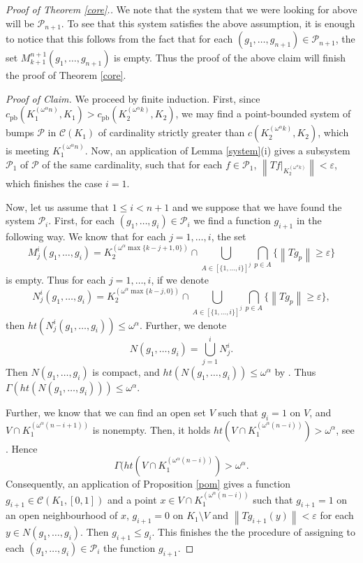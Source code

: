 \documentclass{amsart}
\numberwithin{equation}{section}
\theoremstyle{definition}
\def\C{\mathcal C}
\def\ep{\varepsilon}
\newcommand{\norm}[1]{\left\|#1\right\|}
\begin{document}
\begin{proof}[Proof of Theorem \ref{core}.]
We note that the system that we were looking for above will be $\mathcal{P}_{n+1}$. To see that this system satisfies the above assumption, it is enough to notice that this follows from the fact that for each $(g_1, \ldots, g_{n+1}) \in \mathcal{P}_{n+1}$, the set $M_{k+1}^{n+1}(g_1, \ldots, g_{n+1})$ is empty. Thus the proof of the above claim will finish the proof of Theorem \ref{core}.

\emph{Proof of Claim.}
We proceed by finite induction.
First, since $c_{\text{pb}}(K_1^{(\omega^{\alpha}n)}, K_1)>c_{\text{pb}}(K_2^{(\omega^{\alpha}k)}, K_2)$, we may find a point-bounded system of bumps $\mathcal{P}$ in $\C(K_1)$ of cardinality strictly greater than $c(K_2^{(\omega^{\alpha} k)}, K_2)$, which is meeting $K_1^{(\omega^{\alpha}n)}$. Now, an application of Lemma \ref{system}(i) gives a subsystem $\mathcal{P}_1$ of $\mathcal{P}$ of the same cardinality, such that for each $f \in \mathcal{P}_1$, $\norm{Tf|_{K_2^{(\omega^{\alpha }k)}}}<\ep$, which finishes the case $i=1$. 

Now, let us assume that $1 \leq i<n+1$ and we suppose that we have found the system $\mathcal{P}_i$. First, for each $(g_1, \ldots, g_i) \in \mathcal{P}_i$ we find a function $g_{i+1}$ in the following way. We know that for each $j=1, \ldots, i$, the set 
\[M_j^i(g_1, \ldots ,g_i)=K_2^{(\omega^{\alpha} \max\{k-j+1, 0\})} \cap \bigcup_{A\in[\{ 1,\ldots,i\}]^j} \bigcap_{p \in A} \{ \norm{Tg_p} \geq \ep\}\]
is empty. Thus for each $j=1, \ldots, i$, if we denote
\[N_j^i(g_1, \ldots ,g_i)=K_2^{(\omega^{\alpha} \max\{k-j, 0\})} \cap \bigcup_{A\in[\{1,\dots,i\}]^j} \bigcap_{p \in A} \{ \norm{Tg_p} \geq \ep\},\]
then $ht(N_j^i(g_1, \ldots ,g_i)) \leq \omega^{\alpha}$. 
Further, we denote 
\[N(g_1, \ldots ,g_i)=\bigcup_{j=1}^{i} N_j^i.\] 
Then $N(g_1, \ldots ,g_i)$ is compact, and $ht(N(g_1, \ldots ,g_i)) \leq \omega^{\alpha}$ by \cite[Lemma 2.3(a)]{rondos-somaglia}. Thus $\Gamma(ht(N(g_1, \ldots ,g_i))) \leq \omega^{\alpha}$.

Further, we know that we can find an open set $V$ such that $g_i=1$ on $V$, and $V \cap K_1^{(\omega^{\alpha}(n-i+1))}$ is nonempty. Then, it holds $ht(V \cap K_1^{(\omega^{\alpha}(n-i))}) > \omega^{\alpha}$, see \cite[Lemma 2.3(b) and (c)]{rondos-somaglia}. Hence \[\Gamma(ht(V \cap K_1^{(\omega^{\alpha}(n-i))})>\omega^{\alpha}.\] Consequently, an application of Proposition \ref{pom} gives a function $g_{i+1} \in \C(K_1, [0, 1])$ and a point $x \in V \cap K_1^{(\omega^{\alpha}(n-i))}$ such that $g_{i+1}=1$ on an open neighbourhood of $x$, $g_{i+1}=0$ on $K_1 \setminus V$ and $\norm{Tg_{i+1}(y)}<\ep$ for each $y \in N(g_1, \ldots ,g_i)$. Then $g_{i+1}\leq g_i$. This finishes the the procedure of assigning to each $(g_1, \ldots ,g_i) \in \mathcal{P}_i$ the function $g_{i+1}$.


\end{proof}
\end{document}
